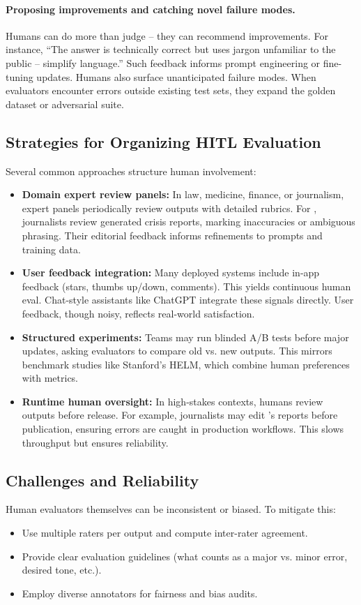 \paragraph*{Proposing improvements and catching novel failure modes.}  
Humans can do more than judge – they can recommend improvements. For instance, “The answer is technically correct but uses jargon unfamiliar to the public – simplify language.” Such feedback informs prompt engineering or fine-tuning updates. Humans also surface unanticipated failure modes. When evaluators encounter errors outside existing test sets, they expand the golden dataset or adversarial suite.  

\subsection*{Strategies for Organizing HITL Evaluation}
Several common approaches structure human involvement:  

\begin{itemize}
    \item \textbf{Domain expert review panels:} In law, medicine, finance, or journalism, expert panels periodically review outputs with detailed rubrics. For \ishtar{}, journalists review generated crisis reports, marking inaccuracies or ambiguous phrasing. Their editorial feedback informs refinements to prompts and training data.  
    \item \textbf{User feedback integration:} Many deployed systems include in-app feedback (stars, thumbs up/down, comments). This yields continuous human eval. Chat-style assistants like ChatGPT integrate these signals directly. User feedback, though noisy, reflects real-world satisfaction.  
    \item \textbf{Structured experiments:} Teams may run blinded A/B tests before major updates, asking evaluators to compare old vs. new outputs. This mirrors benchmark studies like Stanford’s HELM, which combine human preferences with metrics.  
    \item \textbf{Runtime human oversight:} In high-stakes contexts, humans review outputs before release. For example, journalists may edit \ishtar{}’s reports before publication, ensuring errors are caught in production workflows. This slows throughput but ensures reliability.  
\end{itemize}  

\subsection*{Challenges and Reliability}
Human evaluators themselves can be inconsistent or biased. To mitigate this:  
\begin{itemize}
    \item Use multiple raters per output and compute inter-rater agreement.  
    \item Provide clear evaluation guidelines (what counts as a major vs. minor error, desired tone, etc.).  
    \item Employ diverse annotators for fairness and bias audits.  
\end{itemize}  

